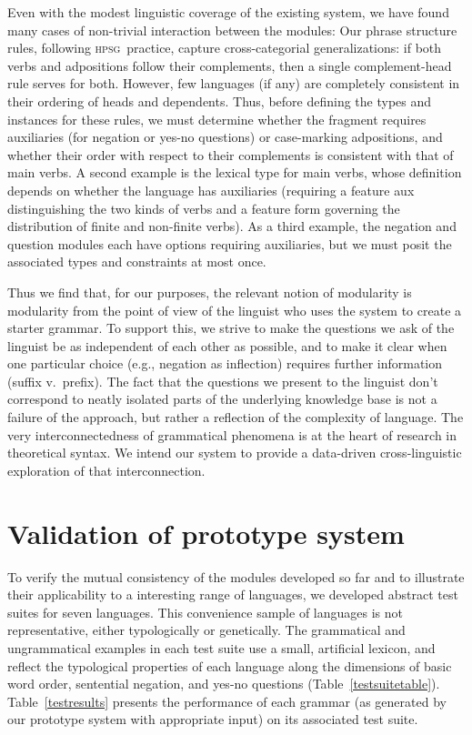\documentclass[11pt]{article}
\newcommand{\hpsg}{\textsc{hpsg}}
\begin{document}
Even with the modest linguistic coverage of the existing
system, we have found many cases of non-trivial interaction between
the modules: Our phrase structure rules, following \hpsg\ practice,
capture cross-categorial generalizations: if both verbs and
adpositions follow their complements, then a single complement-head
rule serves for both.  However, few languages (if any) are completely
consistent in their ordering of heads and dependents.  Thus, before
defining the types and instances for these rules, we must determine
whether the fragment requires auxiliaries (for negation or yes-no
questions) or case-marking adpositions, and whether their order with
respect to their complements is consistent with that of main verbs.  A
second example is the lexical type for main verbs, whose definition
depends on whether the language has auxiliaries (requiring a feature
{\sc aux} distinguishing the two kinds of verbs and a feature {\sc
form} governing the distribution of finite and non-finite verbs).
As a third example, the negation and question modules each have
options requiring auxiliaries, but we must posit the associated types
and constraints at most once.

Thus we find that, for our purposes, the relevant notion of modularity
is modularity from the point of view of the linguist who uses the
system to create a starter grammar.  To support this, we strive to
make the questions we ask of the linguist be as independent of each
other as possible, and to make it clear when one particular choice
(e.g., negation as inflection) requires further information (suffix
v.\ prefix).  The fact that the questions we present to
the linguist don't correspond to neatly isolated parts of the
underlying knowledge base is not a failure of the approach, but
rather a reflection of the complexity of language.
The very interconnectedness of
grammatical phenomena is at the heart of research in theoretical
syntax.  We intend our system to provide a data-driven
cross-linguistic exploration of that interconnection.

\section{Validation of prototype system}


To verify the mutual consistency of the modules developed so far 
and to illustrate their applicability to a interesting range of
languages, we developed abstract test suites for seven languages.
This convenience sample of languages is not representative, either
typologically or genetically.  The grammatical and ungrammatical
examples in each test suite use a small, artificial lexicon, and
reflect the typological properties of each language along the
dimensions of basic word order, sentential negation,
and yes-no questions
(Table~\ref{testsuitetable}). 
Table~\ref{testresults} presents the performance
of each grammar (as generated by our prototype system with appropriate
input) on its associated test suite.
\end{document}

